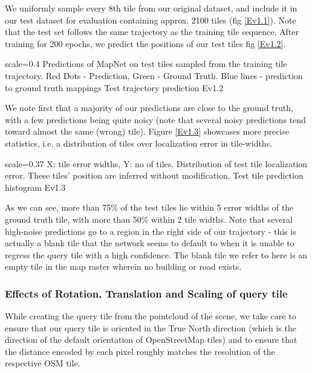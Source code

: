 We uniformly sample every 8th tile from our original dataset, and include it in our test dataset for evaluation containing approx. 2100 tiles (fig \ref{Ev1.1}). Note that the test set follows the same trajectory as the training tile sequence. After training for 200 epochs, we predict the positions of our test tiles {fig \ref{Ev1.2}}. 

{scale=0.4}%
{Predictions of MapNet on test tiles sampled from the training tile trajectory. Red Dots - Prediction, Green - Ground Truth. Blue lines - prediction to ground truth mappings}%
{Test trajectory prediction}%
{Ev1.2}

We note first that a majority of our predictions are close to the ground truth, with a few predictions being quite noisy (note that several noisy predictions tend toward almost the same (wrong) tile). Figure \ref{Ev1.3} showcases more precise statistics, i.e. a distribution of tiles over localization error in tile-widths.

{scale=0.37}%
{X: tile error widths, Y: no of tiles. Distribution of test tile localization error. These tiles' position are inferred without modification.}%
{Test tile prediction histogram}%
{Ev1.3}

As we can see, more than 75\% of the test tiles lie within 5 error widths of the ground truth tile, with more than 50\% within 2 tile widths. Note that several high-noise predictions go to a region in the right side of our trajectory - this is actually a blank tile that the network seems to default to when it is unable to regress the query tile with a high confidence. The blank tile we refer to here is an empty tile in the map raster wherein no building or road exists. 

\subsubsection{Effects of Rotation, Translation and Scaling of query tile}
While creating the query tile from the pointcloud of the scene, we take care to ensure that our query tile is oriented in the True North direction (which is the direction of the default orientation of OpenStreetMap tiles) and to ensure that the distance encoded by each pixel roughly matches the resolution of the respective OSM tile.


